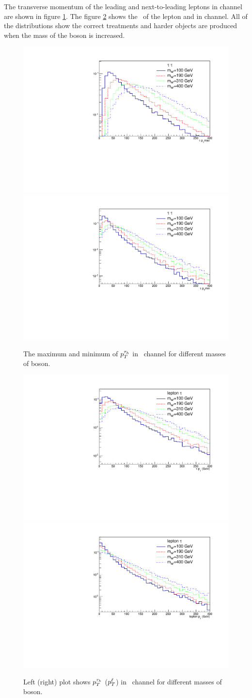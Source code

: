 The transverse momentum of the leading and next-to-leading \Tau leptons in \tauTau channel are shown in figure \ref{fig:pt-hh}. The figure \ref{fig:pt-lh} shows the \pt ~of the lepton and \Tau in \lepTau channel. All of the distributions show the correct treatments and harder objects are produced when the mass of the \wprime boson is increased.
\begin{figure}[htb]
	\centering
	\includegraphics*[width=.45\textwidth]{figs/Pt_hh_max.pdf}
	\hspace{3mm}
	\includegraphics*[width=.45\textwidth]{figs/Pt_hh_min.pdf}
	\caption{The maximum  and minimum of $p_T^{\tau_h}$ in \tauTau ~channel for different masses of \wprime boson.}
	\label{fig:pt-hh}
\end{figure}
\begin{figure}[htb]
	\centering
	\includegraphics*[width=.45\textwidth]{figs/Pt_lh_tau.pdf}
	\hspace{3mm}
	\includegraphics*[width=.45\textwidth]{figs/Pt_lh_lep.pdf}
	\caption{Left (right) plot shows $p_T^{\tau_h}$ ($p_T^{\ell}$) in \lepTau ~channel for different masses of \wprime boson.}
	\label{fig:pt-lh}
\end{figure}

